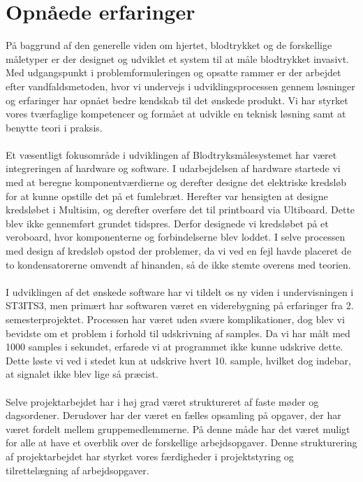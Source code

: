 \section{Opnåede erfaringer}
På baggrund af den generelle viden om hjertet, blodtrykket og de forskellige måletyper er der designet og udviklet et system til at måle blodtrykket invasivt. Med udgangspunkt i problemformuleringen og opsatte rammer er der arbejdet efter vandfaldsmetoden, hvor vi undervejs i udviklingsprocessen gennem løsninger og erfaringer har opnået bedre kendskab til det ønskede produkt. Vi har styrket vores tværfaglige kompetencer og formået at udvikle en teknisk løsning samt at benytte teori i praksis.\\\\
Et væsentligt fokusområde i udviklingen af Blodtryksmålesystemet har været integreringen af hardware og software. I udarbejdelsen af hardware startede vi med at beregne komponentværdierne og derefter designe det elektriske kredsløb for at kunne opstille det på et fumlebræt. Herefter var hensigten at designe kredsløbet i Multisim, og derefter overføre det til printboard via Ultiboard. Dette blev ikke gennemført grundet tidspres. Derfor designede vi kredsløbet på et veroboard, hvor komponenterne og forbindelserne blev loddet. I selve processen med design af kredsløb opstod der problemer, da vi ved en fejl havde placeret de to kondensatorerne omvendt af hinanden, så de ikke stemte overens med teorien. \\\\
I udviklingen af det ønskede software har vi tildelt os ny viden i undervisningen i ST3ITS3, men primært har softwaren været en viderebygning på erfaringer fra 2. semesterprojektet. Processen har været uden svære komplikationer, dog blev vi bevidste om et problem i forhold til udskrivning af samples. Da vi har målt med 1000 samples i sekundet, erfarede vi at programmet ikke kunne udskrive dette. Dette løste vi ved i stedet kun at udskrive hvert 10. sample, hvilket dog indebar, at signalet ikke blev lige så præcist. \\\\ 
Selve projektarbejdet har i høj grad været struktureret af faste møder og dagsordener. Derudover har der været en fælles opsamling på opgaver, der har været fordelt mellem gruppemedlemmerne. På denne måde har det været muligt for alle at have et overblik over de forskellige arbejdsopgaver. Denne strukturering af projektarbejdet har styrket vores færdigheder i projektstyring og tilrettelægning af arbejdsopgaver.


